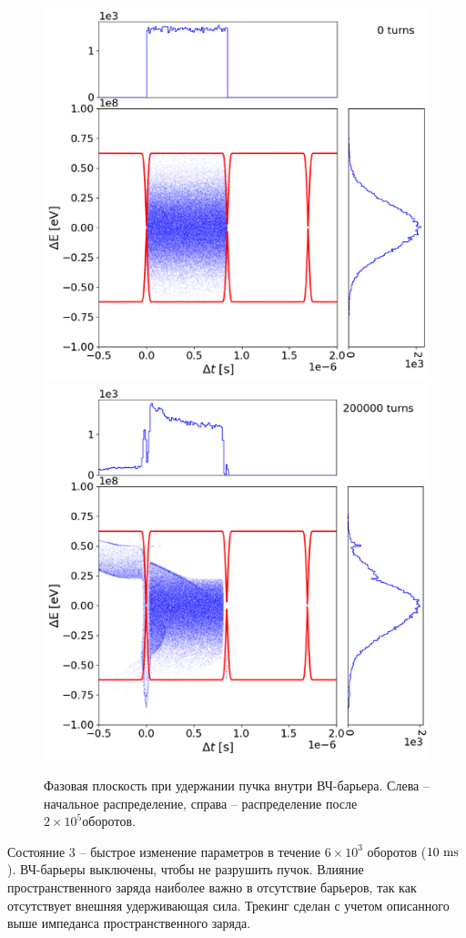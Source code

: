 \documentclass[a4paper,
               keeplastbox,   %
               ]{jacow}
\begin{document}
\begin{figure}[!htb]
   \includegraphics*[width=.49\columnwidth]{img/fig_08-1}
   \includegraphics*[width=.49\columnwidth]{img/fig_08-2}
   \caption{Фазовая плоскость при удержании пучка внутри ВЧ-барьера. Слева – начальное распределение, справа – распределение после $2\times{10}^5 оборотов$.}
   \label{fig:2}
\end{figure}

\par Состояние 3 – быстрое изменение параметров в течение $6\times{10}^3$ оборотов ($10~\rm{ ms}$). ВЧ-барьеры выключены, чтобы не разрушить пучок. Влияние пространственного заряда наиболее важно в отсутствие барьеров, так как отсутствует внешняя удерживающая сила. Трекинг сделан с учетом описанного выше импеданса пространственного заряда.
\end{document}
